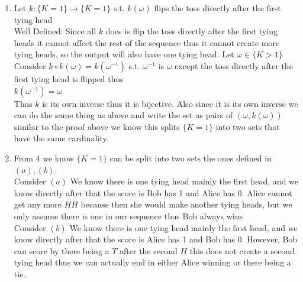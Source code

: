\documentclass[12pt, letterpaper]{article}
\theoremstyle{definition}
\begin{document}
\begin{enumerate}
    Thus consider $(\omega,  r(\omega))$: WLOG let $\omega$ be an element whose toss directly after the first tying head is T and
    the toss directly before the second tying head is $H$\\
    Thus $r(\omega)$ is the element whose sequence between the first two tying heads is flipped from $\omega$ thus $r(\omega)$ is an element whose toss directly
    after the first tying head is $H$ and the toss directly before the second tying head is $T$.\\
    Thus, $\{K > 1\}$ can be written as the pairs of these two elements, and thus it is the union of these two sets. We know they have the same cardinality since each element has a unique element in the other set this is from $r$ being its own inverse thus they have the same cardinality.
    \item Let $k : \{K = 1\} \rightarrow \{K = 1\}$ s.t. $k(\omega)$ flips the toss directly after the first tying head\\
    Well Defined: Since all $k$ does is flip the toss directly after the first tying heads it cannot affect the rest of the sequence thus it cannot create more tying heads, so the output will also have one tying head.
    Let $\omega \in \{K > 1\}$\\
    Consider $k \circ k(\omega)=k(\omega^{-1})$ s.t. $\omega^{-1}$ is $\omega$ except the toss directly after the first tying head is flipped thus\\
    $k(\omega^{-1})=\omega$\\
    Thus $k$ is its own inverse thus it is bijective. Also since it is its own inverse we can do the same thing as above and write the set as pairs of $(\omega, k(\omega))$ similar to the proof above we know this splits $\{K = 1\}$ into two sets that have the same cardinality.
    \item From 4 we know $\{K = 1\}$ can be split into two sets the ones defined in $(a),(b)$.\\
    Consider $(a)$ We know there is one tying head mainly the first head, and we know directly after that the score is Bob has 1 and Alice has 0. Alice cannot get any more $HH$ because then she would make another tying heads, but we only assume there is one in our sequence thus Bob always wins\\
    Consider $(b)$ We know there is one tying head mainly the first head, and we know directly after that the score is Alice has 1 and Bob has 0. However, Bob can score by there being a $T$ after the second $H$ this does not create a second tying head thus we can actually end in either Alice winning or there being a tie.

\end{enumerate}
\end{document}
